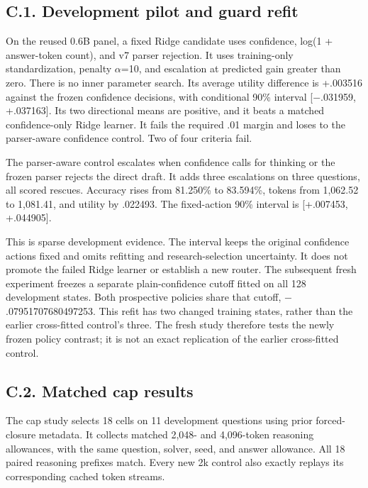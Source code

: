 \documentclass[11pt,a4paper]{article}
\begin{document}
\subsection*{C.1. Development pilot and guard refit}\label{sec:c1-development-pilot-and-guard-refit}
On the reused 0.6B panel, a fixed Ridge candidate uses confidence, log(1 + answer-token count), and v7 parser rejection. It uses training-only standardization, penalty \ensuremath{\alpha}=10, and escalation at predicted gain greater than zero. There is no inner parameter search. Its average utility difference is +.003516 against the frozen confidence decisions, with conditional 90\% interval [\ensuremath{-}.031959, +.037163]. Its two directional means are positive, and it beats a matched confidence-only Ridge learner. It fails the required .01 margin and loses to the parser-aware confidence control. Two of four criteria fail.

The parser-aware control escalates when confidence calls for thinking or the frozen parser rejects the direct draft. It adds three escalations on three questions, all scored rescues. Accuracy rises from 81.250\% to 83.594\%, tokens from 1,062.52 to 1,081.41, and utility by .022493. The fixed-action 90\% interval is [+.007453, +.044905].

This is sparse development evidence. The interval keeps the original confidence actions fixed and omits refitting and research-selection uncertainty. It does not promote the failed Ridge learner or establish a new router. The subsequent fresh experiment freezes a separate plain-confidence cutoff fitted on all 128 development states. Both prospective policies share that cutoff, \ensuremath{-}.07951707680497253. This refit has two changed training states, rather than the earlier cross-fitted control's three. The fresh study therefore tests the newly frozen policy contrast; it is not an exact replication of the earlier cross-fitted control.

\subsection*{C.2. Matched cap results}\label{sec:c2-matched-cap-results}
The cap study selects 18 cells on 11 development questions using prior forced-closure metadata. It collects matched 2,048- and 4,096-token reasoning allowances, with the same question, solver, seed, and answer allowance. All 18 paired reasoning prefixes match. Every new 2k control also exactly replays its corresponding cached token streams.
\end{document}
